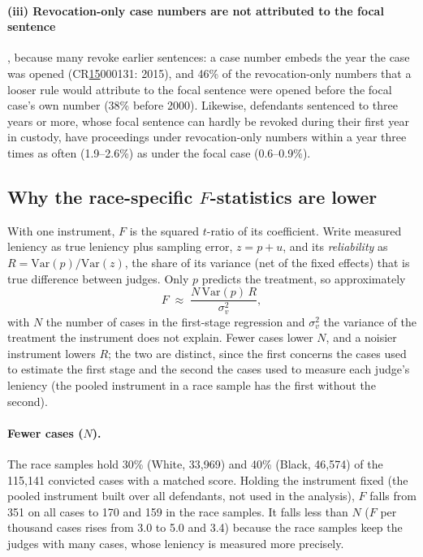 \documentclass[11pt]{article}
\begin{document}
\paragraph{(iii) Revocation-only case numbers are not attributed to the focal sentence}, because many revoke earlier sentences: a case number embeds the year the case was opened (CR\underline{15}000131: 2015), and 46\% of the revocation-only numbers that a looser rule would attribute to the focal sentence were opened before the focal case's own number (38\% before 2000). Likewise, defendants sentenced to three years or more, whose focal sentence can hardly be revoked during their first year in custody, have proceedings under revocation-only numbers within a year three times as often (1.9--2.6\%) as under the focal case (0.6--0.9\%).

\subsection{Why the race-specific $F$-statistics are lower}\label{sec:f_details}

With one instrument, $F$ is the squared $t$-ratio of its coefficient. Write measured leniency as true leniency plus sampling error, $z = p + u$, and its \emph{reliability} as $R = \mathrm{Var}(p)/\mathrm{Var}(z)$, the share of its variance (net of the fixed effects) that is true difference between judges. Only $p$ predicts the treatment, so approximately
\begin{equation*}
F \;\approx\; \frac{N\,\mathrm{Var}(p)\,R}{\sigma^2_v},
\end{equation*}
with $N$ the number of cases in the first-stage regression and $\sigma^2_v$ the variance of the treatment the instrument does not explain. Fewer cases lower $N$, and a noisier instrument lowers $R$; the two are distinct, since the first concerns the cases used to estimate the first stage and the second the cases used to measure each judge's leniency (the pooled instrument in a race sample has the first without the second).

\paragraph{Fewer cases ($N$).} The race samples hold 30\% (White, 33,969) and 40\% (Black, 46,574) of the 115,141 convicted cases with a matched score. Holding the instrument fixed (the pooled instrument built over all defendants, not used in the analysis), $F$ falls from 351 on all cases to 170 and 159 in the race samples. It falls less than $N$ ($F$ per thousand cases rises from 3.0 to 5.0 and 3.4) because the race samples keep the judges with many cases, whose leniency is measured more precisely.
\end{document}
